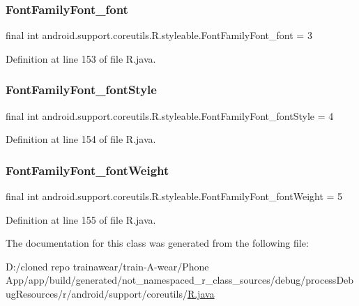 \subsubsection{\texorpdfstring{FontFamilyFont\_font}{FontFamilyFont\_font}}
{\footnotesize\ttfamily final int android.\+support.\+coreutils.\+R.\+styleable.\+Font\+Family\+Font\+\_\+font = 3\hspace{0.3cm}{\ttfamily [static]}}



Definition at line 153 of file R.\+java.

\mbox{\label{classandroid_1_1support_1_1coreutils_1_1_r_1_1styleable_a1ee3d7ad4f282f1250a3ef4c1cb44053}} 
\subsubsection{\texorpdfstring{FontFamilyFont\_fontStyle}{FontFamilyFont\_fontStyle}}
{\footnotesize\ttfamily final int android.\+support.\+coreutils.\+R.\+styleable.\+Font\+Family\+Font\+\_\+font\+Style = 4\hspace{0.3cm}{\ttfamily [static]}}



Definition at line 154 of file R.\+java.

\mbox{\label{classandroid_1_1support_1_1coreutils_1_1_r_1_1styleable_a08ae17280f865bcf7bb8a223b10003cd}} 
\subsubsection{\texorpdfstring{FontFamilyFont\_fontWeight}{FontFamilyFont\_fontWeight}}
{\footnotesize\ttfamily final int android.\+support.\+coreutils.\+R.\+styleable.\+Font\+Family\+Font\+\_\+font\+Weight = 5\hspace{0.3cm}{\ttfamily [static]}}



Definition at line 155 of file R.\+java.



The documentation for this class was generated from the following file\+:\begin{DoxyCompactItemize}
\item 
D\+:/cloned repo trainawear/train-\/\+A-\/wear/\+Phone App/app/build/generated/not\+\_\+namespaced\+\_\+r\+\_\+class\+\_\+sources/debug/process\+Debug\+Resources/r/android/support/coreutils/\mbox{\hyperlink{process_debug_resources_2r_2android_2support_2coreutils_2_r_8java}{R.\+java}}\end{DoxyCompactItemize}
